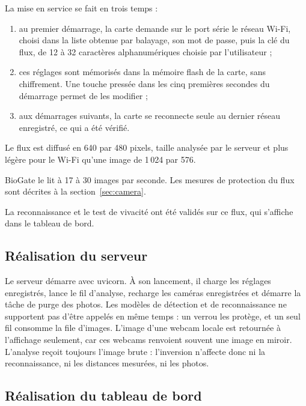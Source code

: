La mise en service se fait en trois temps :
\begin{enumerate}
  \item au premier démarrage, la carte demande sur le port série le réseau Wi-Fi, choisi dans la liste obtenue par balayage, son mot de passe, puis la clé du flux, de 12 à 32 caractères alphanumériques choisie par l'utilisateur ;
  \item ces réglages sont mémorisés dans la mémoire flash de la carte, sans chiffrement. Une touche pressée dans les cinq premières secondes du démarrage permet de les modifier ;
  \item aux démarrages suivants, la carte se reconnecte seule au dernier réseau enregistré, ce qui a été vérifié.
\end{enumerate}

Le flux est diffusé en 640 par 480 pixels, taille analysée par le serveur et plus légère pour le Wi-Fi qu'une image de 1\,024 par 576. \begin{maj}
BioGate le lit à 17 à 30 images par seconde. Les mesures de protection du flux sont décrites à la section~\ref{sec:camera}.
\end{maj}

La reconnaissance et le test de vivacité ont été validés sur ce flux, qui s'affiche dans le tableau de bord.

\subsection{Réalisation du serveur}

\begin{maj}
Le serveur démarre avec uvicorn. À son lancement, il charge les réglages enregistrés, lance le fil d'analyse, recharge les caméras enregistrées et démarre la tâche de purge des photos. Les modèles de détection et de reconnaissance ne supportent pas d'être appelés en même temps : un verrou les protège, et un seul fil consomme la file d'images. L'image d'une webcam locale est retournée à l'affichage seulement, car ces webcams renvoient souvent une image en miroir. L'analyse reçoit toujours l'image brute : l'inversion n'affecte donc ni la reconnaissance, ni les distances mesurées, ni les photos.
\end{maj}

\subsection{Réalisation du tableau de bord}\label{sec:pagesdash}

